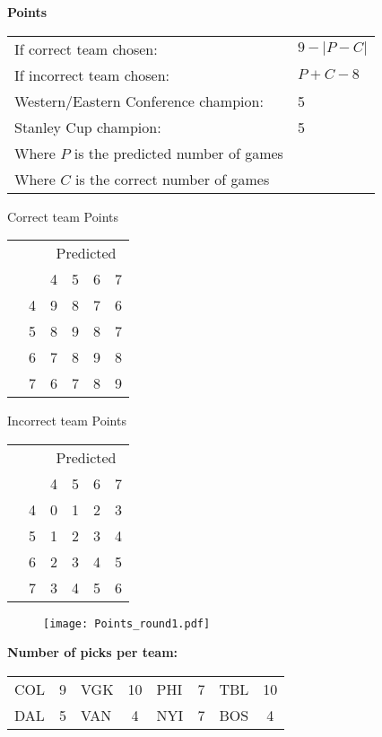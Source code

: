 \documentclass[10pt]{article}
\newcommand{\mccn}[2]{\multicolumn{#1}{c}{#2}}
\begin{document}
\begin{table}[!htb]
    \begin{minipage}[t]{.27\linewidth}
    	{\bf Points}\\
		\begin{tabular}{l l}
			If correct team chosen:	& $9 - |P-C|$\\
			If incorrect team chosen:	& $P+C-8$\\
			Western/Eastern Conference champion:	& 5\\
			Stanley Cup champion:		& 5\\
			Where $P$ is the predicted number of games&\\
			Where $C$ is the correct number of games&
		\end{tabular}
	\end{minipage}
	\begin{minipage}[t]{0.12\linewidth}
	Correct team Points\\
	\begin{tabular}{c l | c c c c }
		\mccn{2}{} & \mccn{4}{Predicted}\\
		& & 4 & 5 & 6 & 7\\\cline{2-6}
		\parbox[t]{2mm}{}&4 & 9 & 8 & 7 & 6\\
		&5 & 8 & 9 & 8 & 7\\
		&6 & 7 & 8 & 9 & 8\\
		&7 & 6 & 7 & 8 & 9
	\end{tabular}
	\end{minipage}
	\begin{minipage}[t]{0.12\linewidth}
	Incorrect team Points\\
	\begin{tabular}{c l | c c c c }
		\mccn{2}{} & \mccn{4}{Predicted}\\
		& & 4 & 5 & 6 & 7\\\cline{2-6}
		\parbox[t]{2mm}{}&4 & 0 & 1 & 2 & 3\\
		&5 & 1 & 2 & 3 & 4\\
		&6 & 2 & 3 & 4 & 5\\
		&7 & 3 & 4 & 5 & 6
	\end{tabular}
\begin{wrapfigure}{r}{0.01\textwidth}
    \vspace{-3.6cm}
	\texttt{[image: Points\_round1.pdf]}
\end{wrapfigure}
	\end{minipage}
\end{table}
    \begin{minipage}[t]{.45\linewidth}
    	{\bf Number of picks per team:}\\
\begin{tabular}{lc | lc | lc | lc }
COL&9&VGK&10&PHI&7&TBL&10\\
DAL&5&VAN&4&NYI&7&BOS&4\\
        \end{tabular}
    \end{minipage}
\end{document}
